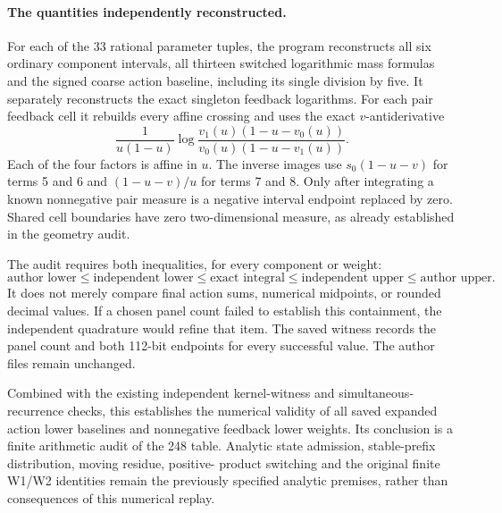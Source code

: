 \paragraph{The quantities independently reconstructed.}
For each of the 33 rational parameter tuples, the program reconstructs
all six ordinary component intervals, all thirteen switched logarithmic
mass formulas and the signed coarse action baseline, including its
single division by five.  It separately reconstructs the exact
singleton feedback logarithms.  For each pair feedback cell it rebuilds
every affine crossing and uses the exact $v$-antiderivative
\[
 \frac1{u(1-u)}\log
 \frac{v_1(u)(1-u-v_0(u))}{v_0(u)(1-u-v_1(u))}.
\]
Each of the four factors is affine in $u$.  The inverse images use
$s_0(1-u-v)$ for terms 5 and 6 and $(1-u-v)/u$ for terms 7 and 8.
Only after integrating a known nonnegative pair measure is a negative
interval endpoint replaced by zero.  Shared cell boundaries have zero
two-dimensional measure, as already established in the geometry audit.

The audit requires both inequalities, for every component or weight:
\[
 \text{author lower}\le\text{independent lower}
 \le\text{exact integral}\le\text{independent upper}
 \le\text{author upper}.
\]
It does not merely compare final action sums, numerical midpoints, or
rounded decimal values.  If a chosen panel count failed to establish
this containment, the independent quadrature would refine that item.
The saved witness records the panel count and both 112-bit endpoints
for every successful value.  The author files remain unchanged.

Combined with the existing independent kernel-witness and simultaneous-
recurrence checks, this establishes the numerical validity of all saved
expanded action lower baselines and nonnegative feedback lower weights.
Its conclusion is a finite arithmetic audit of the 248 table.  Analytic
state admission, stable-prefix distribution, moving residue, positive-
product switching and the original finite W1/W2 identities remain the
previously specified analytic premises, rather than consequences of
this numerical replay.
